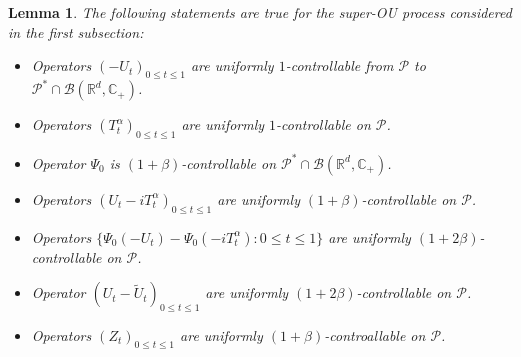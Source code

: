 \documentclass[12pt,oneside,english]{amsart}
\theoremstyle{plain}
\newtheorem{lem}[thm]{Lemma}
\theoremstyle{definition}
\numberwithin{equation}{section}
\newcommand{\added}[1]{{\color{blue}#1}}\newcommand{\deleted}[1]{{\color{red}#1}}
\begin{document}
\begin{lem}
\label{lem: upper bound for usgx}
\added{The following statements are true for the super-OU process considered in the first subsection:}
\begin{itemize}
\item[(1)]
    Operators $(-U_t)_{0\leq t\leq 1}$ are uniformly $1$-controllable from $\mathcal P$ to $\mathcal P^*\cap \mathcal B(\mathbb R^d, \mathbb C_+)$.
\item[(2)]
    Operators $(T^\alpha_t)_{0\leq t\leq 1}$ are uniformly $1$-controllable on $\mathcal P$.
\item[(3)]
    Operator $\Psi_0$ is $(1+\beta)$-controllable on $\mathcal P^* \cap \mathcal B(\mathbb R^d, \mathbb C_+)$.
\item[(4)]
    Operators $(U_t- iT_t^{\alpha})_{0\leq t\leq 1}$ are uniformly $(1+\beta)$-controllable on $\mathcal P$.
\item[(5)]
    Operators $\{\Psi_0(-U_t) - \Psi_0(-iT_t^\alpha): 0\leq t\leq 1\}$ are uniformly $(1+2\beta)$-controllable on $\mathcal P$.
\item[(6)]
    Operator $(U_t-\tilde U_t)_{0\leq t\leq 1}$ are uniformly $(1+2\beta)$-controllable on $\mathcal P$.
\item[(7)]
    Operators $(Z_t)_{0\leq t\leq 1}$ are uniformly $(1+\beta)$-controallable on $\mathcal P$.
\end{itemize}
\end{lem}
\end{document}
